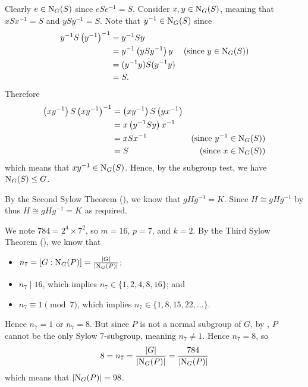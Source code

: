 \begin{questions}
    \item Clearly $e \in \mathrm{N}_{G}(S)$ since $eSe^{-1} = S$. Consider $x, y \in \mathrm{N}_{G}(S)$, meaning that $xSx^{-1} = S$ and $ySy^{-1} = S$. Note that $y^{-1} \in \mathrm{N}_{G}(S)$ since
    \begin{align*}
        y^{-1}S\left(y^{-1}\right)^{-1} &= y^{-1}Sy\\
        &= y^{-1}\left(ySy^{-1}\right)y & (\text{since } y \in \mathrm{N}_{G}(S))\\
        &= (y^{-1}y)S(y^{-1}y)\\
        &= S.
    \end{align*}
    Therefore
    \begin{align*}
        \left(xy^{-1}\right)S\left(xy^{-1}\right)^{-1} &= \left(xy^{-1}\right)S\left(yx^{-1}\right)\\
        &= x\left(y^{-1}Sy\right)x^{-1}\\
        &= xSx^{-1} & (\text{since } y^{-1} \in \mathrm{N}_{G}(S))\\
        &= S & (\text{since } x \in \mathrm{N}_{G}(S))
    \end{align*}
    which means that $xy^{-1} \in \mathrm{N}_{G}(S)$. Hence, by the subgroup test, we have $\mathrm{N}_{G}(S) \leq G$.

    \item By the Second Sylow Theorem (), we know that $gHg^{-1} = K$. Since $H \cong gHg^{-1}$ by  thus $H \cong gHg^{-1} = K$ as required.

    \item We note $784 = 2^4 \times 7^2$, so $m = 16$, $p = 7$, and $k = 2$. By the Third Sylow Theorem (), we know that
    \begin{itemize}
        \item $n_7 = [G : \mathrm{N}_{G}(P)] = \frac{|G|}{|\mathrm{N}_{G}(P)|}$;
        \item $n_7 \mid 16$, which implies $n_7 \in \{1, 2, 4, 8, 16\}$; and
        \item $n_7 \equiv 1 \pmod 7$, which implies $n_7 \in \{1, 8, 15, 22, \dots\}$.
    \end{itemize}
    Hence $n_7 = 1$ or $n_7 = 8$. But since $P$ is not a normal subgroup of $G$, by , $P$ cannot be the only Sylow 7-subgroup, meaning $n_7 \neq 1$. Hence $n_7 = 8$, so
    \[
        8 = n_7 = \frac{|G|}{|\mathrm{N}_{G}(P)|} = \frac{784}{|\mathrm{N}_{G}(P)|}
    \]
    which means that $|\mathrm{N}_{G}(P)| = 98$.


\end{questions}
